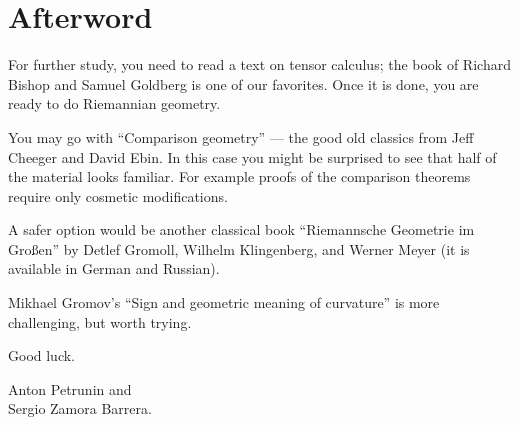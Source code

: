 \chapter*{Afterword}



For further study, you need to read a text on tensor calculus; the book of Richard Bishop and Samuel Goldberg \cite{bishop-goldberg} is one of our favorites.
Once it is done, you are ready to do Riemannian geometry.

You may go with  ``Comparison geometry'' \cite{cheeger-ebin} --- the good old classics from Jeff Cheeger and David Ebin. 
In this case you might be surprised to see that half of the material looks familiar.
For example proofs of the comparison theorems require only cosmetic modifications.

A safer option would be another classical book ``Riemannsche Geometrie im Großen'' \cite{gromoll-klingenberg-meyer} by 
Detlef Gromoll,
Wilhelm Klingenberg, 
and  Werner Meyer (it is available in German and Russian).

Mikhael Gromov's ``Sign and geometric meaning of curvature'' \cite{gromov-1991} is more challenging, but worth trying. 

Good luck.

\begin{flushright}
Anton Petrunin and\\
Sergio Zamora Barrera.
\end{flushright}
